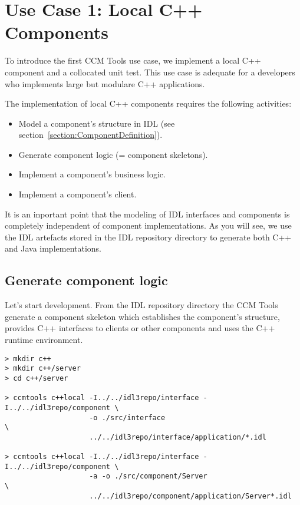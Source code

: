 \section{Use Case 1: Local C++ Components}
\label{section:LocalC++ComponentImplementation}

To introduce the first CCM Tools use case, we implement a local C++ component and a
collocated unit test. This use case is adequate for a developers who implements
large but modulare C++ applications.

\vspace{3mm}
The implementation of local C++ components requires the following activities:
\begin{itemize}
	\item Model a component's structure in IDL 
			(see section~\ref{section:ComponentDefinition}). 
	\item Generate component logic (= component skeletons).
	\item Implement a component's business logic.
	\item Implement a component's client.

\end{itemize}

It is an inportant point that the modeling of IDL interfaces and components 
is completely independent of component implementations.
As you will see, we use the IDL artefacts stored in the IDL repository directory
to generate both C++ and Java implementations.  
 
 
\subsection{Generate component logic}
\label{subsection:GenerateComponentLogic}

Let's start development. From the IDL repository directory the CCM Tools
generate a component skeleton which establishes the component's structure,
provides C++ interfaces to clients or other components and uses the C++ runtime 
environment.

\begin{verbatim}
> mkdir c++
> mkdir c++/server
> cd c++/server

> ccmtools c++local -I../../idl3repo/interface -I../../idl3repo/component \
                    -o ./src/interface                                    \
                    ../../idl3repo/interface/application/*.idl            

> ccmtools c++local -I../../idl3repo/interface -I../../idl3repo/component \
                    -a -o ./src/component/Server                          \
                    ../../idl3repo/component/application/Server*.idl
\end{verbatim}

